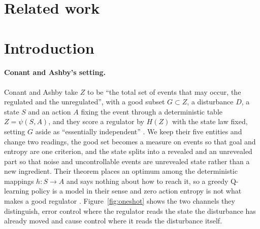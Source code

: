 \section[Related work]{Related work }
\label{sec:related}



\section[Introduction]{Introduction }
\label{sec:intro}



\paragraph{Conant and Ashby's setting.}
Conant and Ashby take $Z$ to be ``the total set of events that may occur, the regulated and the unregulated'', with a good subset $G \subset Z$, a disturbance $D$, a state $S$ and an action $A$ fixing the event through a deterministic table $Z = \psi(S,A)$, and they score a regulator by $H(Z)$ with the state law fixed, setting $G$ aside as ``essentially independent'' \citep{Conant-good70}.
We keep their five entities and change two readings, the good set becomes a measure on events so that goal and entropy are one criterion, and the state splits into a revealed and an unrevealed part so that noise and uncontrollable events are unrevealed state rather than a new ingredient.
Their theorem places an optimum among the deterministic mappings $h\colon S \to A$ and says nothing about how to reach it, so a greedy Q-learning policy is a model in their sense and zero action entropy is not what makes a good regulator \citep[pp.~95--96]{Conant-good70}.
Figure~\ref{fig:oneshot} shows the two channels they distinguish, error control where the regulator reads the state the disturbance has already moved and cause control where it reads the disturbance itself.

